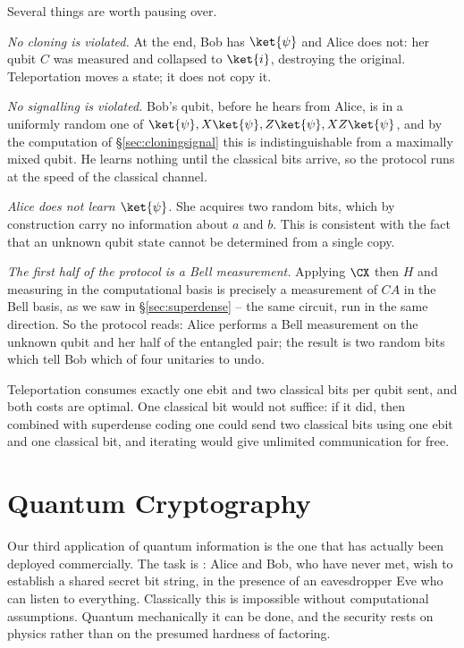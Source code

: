 Several things are worth pausing over.

\emph{No cloning is violated.} At the end, Bob has $\ket{\psi}$ and Alice does not: her qubit $C$ was measured and collapsed to $\ket{i}$, destroying the original. Teleportation moves a state; it does not copy it.

\emph{No signalling is violated.} Bob's qubit, before he hears from Alice, is in a uniformly random one of $\ket{\psi}, X\ket{\psi}, Z\ket{\psi}, XZ\ket{\psi}$, and by the computation of \S\ref{sec:cloningsignal} this is indistinguishable from a maximally mixed qubit. He learns nothing until the classical bits arrive, so the protocol runs at the speed of the classical channel.

\emph{Alice does not learn $\ket{\psi}$.} She acquires two random bits, which by construction carry no information about $a$ and $b$. This is consistent with the fact that an unknown qubit state cannot be determined from a single copy.

\emph{The first half of the protocol is a Bell measurement.} Applying $\CX$ then $H$ and measuring in the computational basis is precisely a measurement of $CA$ in the Bell basis, as we saw in \S\ref{sec:superdense} -- the same circuit, run in the same direction. So the protocol reads: Alice performs a Bell measurement on the unknown qubit and her half of the entangled pair; the result is two random bits which tell Bob which of four unitaries to undo.

\begin{remark}
	Teleportation consumes exactly one ebit and two classical bits per qubit sent, and both costs are optimal. One classical bit would not suffice: if it did, then combined with superdense coding one could send two classical bits using one ebit and one classical bit, and iterating would give unlimited communication for free.
\end{remark}

\section{Quantum Cryptography}\label{qic-sec:crypto}

Our third application of quantum information is the one that has actually been deployed commercially. The task is : Alice and Bob, who have never met, wish to establish a shared secret bit string, in the presence of an eavesdropper Eve who can listen to everything. Classically this is impossible without computational assumptions. Quantum mechanically it can be done, and the security rests on physics rather than on the presumed hardness of factoring.

